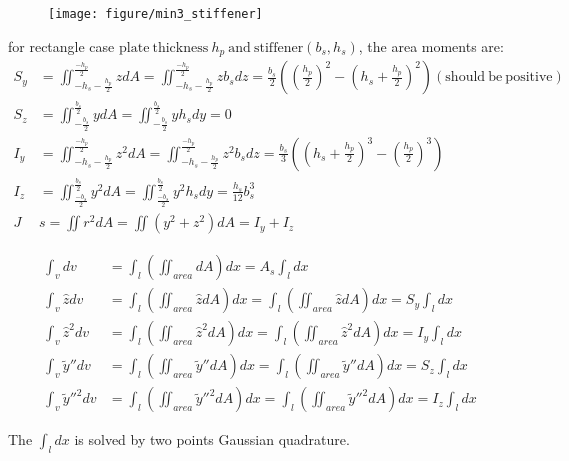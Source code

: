 \begin{figure}[h!]
\centering
\texttt{[image: figure/min3\_stiffener]}
\caption{}
\label{fig:min3stiffener}
\end{figure}


for rectangle case $ \mathrm{plate~thickness}~h_p~\mathrm{and~stiffener } (b_s, h_s) $, the area moments are:
\begin{align*}
S_y &= \iint_{-h_s-\frac{h_p}{2}}^{\frac{-h_p}{2}} z dA = \iint_{-h_s-\frac{h_p}{2}}^{\frac{-h_p}{2}} z b_s dz = \frac{b_s}{2} \left( \left(\frac{h_p}{2}\right) ^2 - \left( h_s+\frac{h_p}{2}\right) ^2\right) (\mathrm{should~be~positive})\\
S_z &= \iint_{-\frac{b_s}{2}}^{\frac{b_s}{2}} y dA = \iint_{-\frac{b_s}{2}}^{\frac{b_s}{2}} y h_s dy = 0\\
I_y &= \iint_{-h_s-\frac{h_p}{2}}^{\frac{-h_p}{2}} z^2 dA = \iint_{-h_s-\frac{h_p}{2}}^{\frac{-h_p}{2}} z^2 b_s dz = \frac{b_s}{3} \left( \left( h_s+\frac{h_p}{2}\right)^3 - \left( \frac{h_p}{2}\right)^3   \right) \\
I_z &= \iint_{\frac{-b_s}{2}}^{\frac{b_s}{2}} y^2 dA = \iint_{\frac{-b_s}{2}}^{\frac{b_s}{2}} y^2 h_s dy = \frac{h_s}{12} b_s^3 \\ 
J &s= \iint r^2 dA = \iint \left( y^2+z^2\right)  dA = I_y + I_z
\end{align*}

\begin{align*}
\int_v dv &= \int_l \left( \iint_{area} dA \right) dx = A_s \int_l dx \\
\int_v \hat{z} dv &= \int_l \left( \iint_{area} \hat{z} dA \right) dx = \int_l \left( \iint_{area} \hat{z} dA \right) dx = S_y \int_l dx   \\
\int_v \hat{z}^2 dv &= \int_l \left( \iint_{area} \hat{z}^2 dA \right) dx = \int_l \left( \iint_{area} \hat{z}^2 dA \right) dx = I_y \int_l dx \\
\int_v \tilde{y}'' dv &= \int_l \left( \iint_{area} \tilde{y}'' dA \right) dx = \int_l \left( \iint_{area} \tilde{y}'' dA \right) dx = S_z \int_l dx \\
\int_v \tilde{y}''^2 dv &= \int_l \left( \iint_{area} \tilde{y}''^2 dA \right) dx  = \int_l \left( \iint_{area} \tilde{y}''^2 dA \right) dx = I_z \int_l dx   
\end{align*}

The $ \int_l dx $ is solved by two points Gaussian quadrature.

